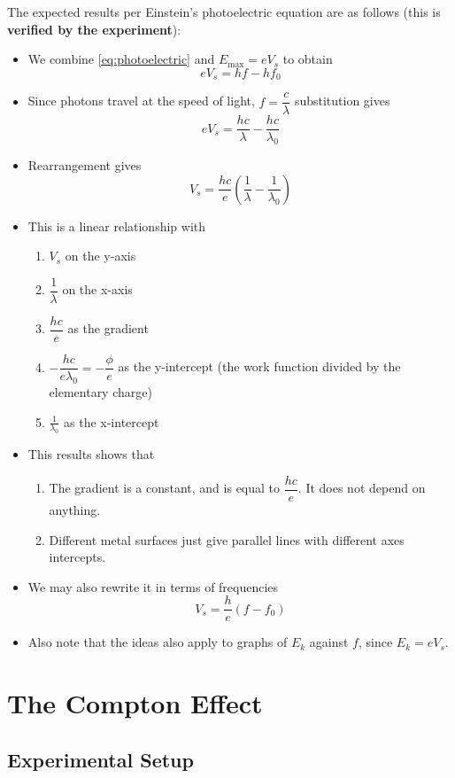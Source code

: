 \documentclass[a4paper,12pt]{article}
\let\oldsection\section
\renewcommand\section{\clearpage\oldsection}
\newcommand{\paren}[1]{\left(#1\right)}
\begin{document}
The expected results per Einstein's photoelectric equation are as follows (this is \textbf{verified by the experiment}):
\begin{itemize}
  \item We combine \cref{eq:photoelectric} and $E_{\max} = eV_s$ to obtain
        $$
          eV_s = hf - hf_0
        $$
  \item Since photons travel at the speed of light, $f = \dfrac{c}{\lambda}$ substitution gives
        $$
          eV_s = \dfrac{hc}{\lambda} -\dfrac{hc}{\lambda_0}
        $$
  \item Rearrangement gives
        $$
          V_s = \dfrac{hc}{e}\paren{\dfrac{1}{\lambda} - \dfrac{1}{\lambda_0}}
        $$
  \item This is a linear relationship with
        \begin{enumerate}
          \item $V_s$ on the y-axis
          \item $\dfrac{1}{\lambda}$ on the x-axis
          \item $\dfrac{hc}{e}$ as the gradient
          \item $-\dfrac{hc}{e\lambda_0} = -\dfrac{\phi}{e}$ as the y-intercept (the work function divided by the elementary charge)
          \item $\frac{1}{\lambda_0}$ as the x-intercept
        \end{enumerate}
  \item This results shows that
        \begin{enumerate}
          \item The gradient is a constant, and is equal to $\dfrac{hc}{e}$. It does not depend on anything.
          \item Different metal surfaces just give parallel lines with different axes intercepts.
        \end{enumerate}
  \item We may also rewrite it in terms of frequencies
        $$V_s = \frac{h}{e}\paren{f - f_0}$$
  \item Also note that the ideas also apply to graphs of $E_k$ against $f$, since $E_k = eV_s$.
\end{itemize}


\section{The Compton Effect}

\subsection{Experimental Setup}
\end{document}
